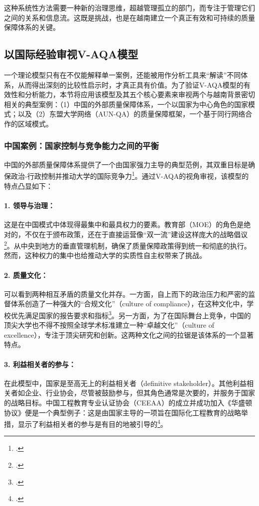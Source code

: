 这种系统性方法需要一种新的治理思维，超越管理孤立的部门，而专注于管理它们之间的关系和信息流。这既是挑战，也是在越南建立一个真正有效和可持续的质量保障体系的关键。



\subsection{以国际经验审视V-AQA模型}
\label{subsec:soi_chieu_quoc_te}
一个理论模型只有在不仅能解释单一案例，还能被用作分析工具来“解读”不同体系，从而得出深刻的比较性启示时，才真正具有价值。为了验证V-AQA模型的有效性和分析能力，本节将应用该模型及其五个核心要素来审视两个与越南背景密切相关的典型案例：（1）中国的外部质量保障体系，一个以国家为中心角色的国家模式；以及（2）东盟大学网络（AUN-QA）的质量保障框架，一个基于同行网络合作的区域模式。

\subsubsection{中国案例：国家控制与竞争能力之间的平衡}
\label{subsubsec:case_china}
中国的外部质量保障体系提供了一个由国家强力主导的典型范例，其双重目标是确保政治-行政控制并推动大学的国际竞争力\footcite{ChinaEQA_Overview}。通过V-AQA的视角审视，该模型的特点凸显如下：

\paragraph{1. 领导与治理：} 这是在中国模式中体现得最集中和最具权力的要素。教育部（MOE）的角色是绝对的，不仅在于颁布政策，还在于直接运营像“双一流”建设这样庞大的战略倡议\footcite{ChinaEQA_Reforms2015}。从中央到地方的垂直管理机制，确保了质量保障政策得到统一和彻底的执行。然而，这种权力的集中也给推动大学的实质性自主权带来了挑战。

\paragraph{2. 质量文化：} 可以看到两种相互矛盾的质量文化并存。一方面，自上而下的政治压力和严密的监督体系创造了一种强大的“合规文化”（culture of compliance），在这种文化中，学校优先满足国家的报告要求和指标\footcite{ChinaEQA_Ideology2023}。另一方面，为了在国际舞台上竞争，中国的顶尖大学也不得不按照全球学术标准建立一种“卓越文化”（culture of excellence），专注于顶尖研究和创新。这两种文化之间的拉锯是该体系的一个显著特点。

\paragraph{3. 利益相关者的参与：} 在此模型中，国家是至高无上的利益相关者（definitive stakeholder）。其他利益相关者如企业、行业协会，尽管被鼓励参与，但其角色通常是次要的，并服务于国家的战略目标。中国工程教育专业认证协会（CEEAA）的成立并成功加入《华盛顿协议》便是一个典型例子：这是由国家主导的一项旨在国际化工程教育的战略举措，显示了利益相关者的参与是有目的地被引导的\footcite{ChinaEQA_CEEAA_WA}。

